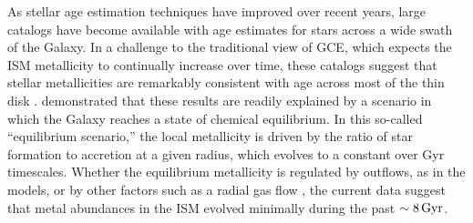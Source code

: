 \documentclass[twocolumn,twocolappendix,linenumbers]{aastex631}
\newcommand{\aFe}{[$\alpha$/Fe]\xspace}
\newcommand{\Gyr}{\,{\rm Gyr}}
\begin{document}

As stellar age estimation techniques have improved over recent years, large catalogs have become available with age estimates for stars across a wide swath of the Galaxy. In a challenge to the traditional view of GCE, which expects the ISM metallicity to continually increase over time, these catalogs suggest that stellar metallicities are remarkably consistent with age across most of the thin disk \citep[e.g.,][]{spina_mapping_2022,magrini_gaia-eso_2023,willett_evolution_2023,carbajo-hijarrubia_occaso_2024,gallart_chronology_2024}. \citet{johnson_milky_2024} demonstrated that these results are readily explained by a scenario in which the Galaxy reaches a state of chemical equilibrium. In this so-called ``equilibrium scenario,'' the local metallicity is driven by the ratio of star formation to accretion at a given radius, which evolves to a constant over Gyr timescales. Whether the equilibrium metallicity is regulated by outflows, as in the  \citet{johnson_milky_2024} models, or by other factors such as a radial gas flow \citep{spitoni_effects_2011,bilitewski_radial_2012,sharda_interplay_2024}, the current data suggest that metal abundances in the ISM evolved minimally during the past $\sim8\Gyr$.
\end{document}
